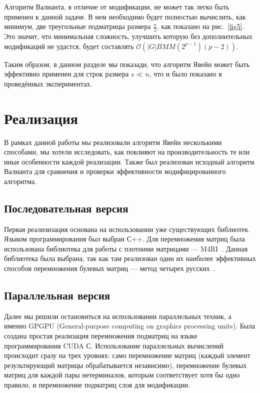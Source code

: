 \documentclass[14pt]{matmex-diploma-custom}
\begin{document}
Алгоритм Валианта, в отличие от модификации, не может так легко быть применен к данной задаче. В нем необходимо будет полностью вычислить, как минимум, две треугольные подматрицы размера $\frac{n}{2}$, как показано на рис.~\ref{fig5}.
Это значит, что минимальная сложность, улучшить которую без дополнительных модификаций не удастся, будет составлять $\mathcal{O}(|G|BMM(2^{p - 1})(p - 2))$.

Таким образом, в данном разделе мы показади, что алгоритм Явейн может быть эффективно применен для строк размера $s \ll n$, что и было показано в проведённых экспериментах.



\section{Реализация}

В рамках данной работы мы реализовали алгоритм Явейн несколькими способами, мы хотели исследовать, как повлияют на производительность те или иные особенности каждой реализации. Также был реализован исходный алгоритм Валианта для сравнения и проверки эффективности модифицированного алгоритма.

\subsection{Последовательная версия}

Первая реализизация основана на использовании уже существующих библиотек. 
Языком программирования был выбран С++. Для перемножения матриц была использована библиотека для работы с плотними матрицами --- M4RI~\cite{M4RI}. 
Данная библиотека была выбрана, так как там реализован один их наиболее эффективных способов перемножения булевых матриц --- метод четырех русских~\cite{arlazarov1970economical, albrechtefficient}.  

\subsection{Параллельная версия}

Далее мы решили остановиться на использовании параллельных техник, а именно GPGPU (General-purpose computing on graphics processing units). Была создана простая реализация перемножения подматриц на языке программирования CUDA С. Использование параллельных вычислений происходит сразу на трех уровнях: само перемножение матриц (каждый элемент результирующий матрицы обрабатывается независимо), перемножение булевых матриц для каждой пары нетерминалов, которым соответствует хотя бы одно правило, и перемножение подматриц слоя для модификации. 
\end{document}
